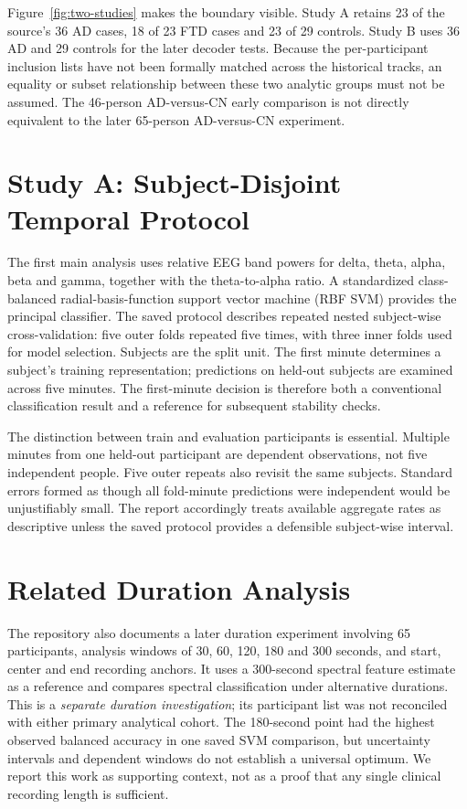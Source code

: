
Figure~\ref{fig:two-studies} makes the boundary visible. Study A retains 23 of the source's 36 AD cases, 18 of 23 FTD cases and 23 of 29 controls. Study B uses 36 AD and 29 controls for the later decoder tests. Because the per-participant inclusion lists have not been formally matched across the historical tracks, an equality or subset relationship between these two analytic groups must not be assumed. The 46-person AD-versus-CN early comparison is not directly equivalent to the later 65-person AD-versus-CN experiment.

\section{Study A: Subject-Disjoint Temporal Protocol}
The first main analysis uses relative EEG band powers for delta, theta, alpha, beta and gamma, together with the theta-to-alpha ratio. A standardized class-balanced radial-basis-function support vector machine (RBF SVM) provides the principal classifier. The saved protocol describes repeated nested subject-wise cross-validation: five outer folds repeated five times, with three inner folds used for model selection. Subjects are the split unit. The first minute determines a subject's training representation; predictions on held-out subjects are examined across five minutes. The first-minute decision is therefore both a conventional classification result and a reference for subsequent stability checks.

The distinction between train and evaluation participants is essential. Multiple minutes from one held-out participant are dependent observations, not five independent people. Five outer repeats also revisit the same subjects. Standard errors formed as though all fold-minute predictions were independent would be unjustifiably small. The report accordingly treats available aggregate rates as descriptive unless the saved protocol provides a defensible subject-wise interval.

\section{Related Duration Analysis}
The repository also documents a later duration experiment involving 65 participants, analysis windows of 30, 60, 120, 180 and 300 seconds, and start, center and end recording anchors. It uses a 300-second spectral feature estimate as a reference and compares spectral classification under alternative durations. This is a \emph{separate duration investigation}; its participant list was not reconciled with either primary analytical cohort. The 180-second point had the highest observed balanced accuracy in one saved SVM comparison, but uncertainty intervals and dependent windows do not establish a universal optimum. We report this work as supporting context, not as a proof that any single clinical recording length is sufficient.

